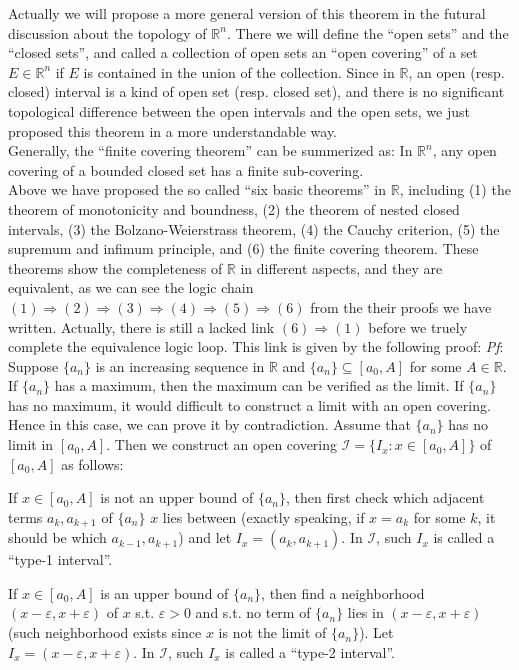 \documentclass{article}
\begin{document}
\begin{Rmk}{}
    Actually we will propose a more general version of this theorem in the futural discussion about the topology of $\mathbb{R}^n$. There we will define the ``open sets'' and the ``closed sets'', and called a collection of open sets an ``open covering'' of a set $E\in\mathbb{R}^n$ if $E$ is contained in the union of the collection. Since in $\mathbb{R}$, an open (resp. closed) interval is a kind of open set (resp. closed set), and there is no significant topological difference between the open intervals and the open sets, we just proposed this theorem in a more understandable way.\\
    Generally, the ``finite covering theorem'' can be summerized as: \textcolor{Th}{In $\mathbb{R}^n$, any open covering of a bounded closed set has a finite sub-covering.}\\
    Above we have proposed the so called ``six basic theorems'' in $\mathbb{R}$, including (1) the theorem of monotonicity and boundness, (2) the theorem of nested closed intervals, (3) the Bolzano-Weierstrass theorem, (4) the Cauchy criterion, (5) the supremum and infimum principle, and (6) the finite covering theorem. These theorems show the completeness of $\mathbb{R}$ in different aspects, and they are equivalent, as we can see the logic chain $(1)\Rightarrow (2)\Rightarrow (3)\Rightarrow (4)\Rightarrow (5)\Rightarrow (6)$ from the their proofs we have written. Actually, there is still a lacked link $(6)\Rightarrow (1)$ before we truely complete the equivalence logic loop. This link is given by the following proof:
    \tcblower
    \textit{Pf}: Suppose $\{a_n\}$ is an increasing sequence in $\mathbb{R}$ and $\{a_n\}\subseteq [a_0, A]$ for some $A\in\mathbb{R}$. If $\{a_n\}$ has a maximum, then the maximum can be verified as the limit. If $\{a_n\}$ has no maximum, it would difficult to construct a limit with an open covering. Hence in this case, we can prove it by contradiction. Assume that $\{a_n\}$ has no limit in $[a_0, A]$. Then we construct an open covering $\mathcal{I} = \{I_x: x\in [a_0, A]\}$ of $[a_0, A]$ as follows:
    \begin{compactenum}
        \item If $x\in[a_0, A]$ is not an upper bound of $\{a_n\}$, then first check which adjacent terms $a_k, a_{k+1}$ of $\{a_n\}$ $x$ lies between (exactly speaking, if $x=a_k$ for some $k$, it should be which $a_{k-1}, a_{k+1}$) and let $I_x = (a_k, a_{k+1})$. In $\mathcal{I}$, such $I_x$ is called a ``type-1 interval''.
        \item If $x\in[a_0, A]$ is an upper bound of $\{a_n\}$, then find a neighborhood $(x-\varepsilon, x+\varepsilon)$ of $x$ s.t. $\varepsilon>0$ and s.t. no term of $\{a_n\}$ lies in $(x-\varepsilon, x+\varepsilon)$ (such neighborhood exists since $x$ is not the limit of $\{a_n\}$). Let $I_x = (x-\varepsilon, x+\varepsilon)$. In $\mathcal{I}$, such $I_x$ is called a ``type-2 interval''.

\end{compactenum}
\end{Rmk}
\end{document}
